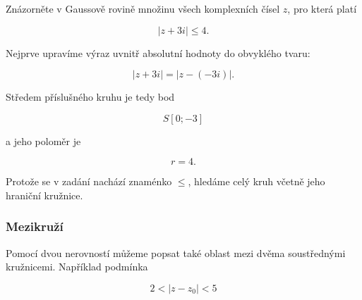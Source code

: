 \documentclass[12pt,a4paper]{article}
\begin{document}
\begin{examplebox}

    Znázorněte v Gaussově rovině množinu všech komplexních čísel $z$, pro která platí

    \[
        |z+3i|\leq4.
    \]

    Nejprve upravíme výraz uvnitř absolutní hodnoty do obvyklého tvaru:

    \[
        |z+3i|
        =
        |z-(-3i)|.
    \]

    Středem příslušného kruhu je tedy bod

    \[
        S[0;-3]
    \]

    a jeho poloměr je

    \[
        r=4.
    \]

    Protože se v zadání nachází znaménko $\leq$, hledáme celý kruh včetně jeho
    hraniční kružnice.

    \begin{center}
    \end{center}

\end{examplebox}


\subsubsection*{Mezikruží}

Pomocí dvou nerovností můžeme popsat také oblast mezi dvěma soustřednými
kružnicemi. Například podmínka

\[
    2<|z-z_0|<5
\]
\end{document}
